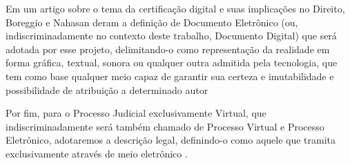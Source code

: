   Em um artigo sobre o tema da certificação digital e suas
  implicações no Direito, Boreggio e Nahasan
  \nocite{CertificadoDigital} deram a definição de Documento
  Eletrônico (ou, indiscriminadamente no contexto deste trabalho,
  Documento Digital) que será adotada por esse projeto,
  delimitando-o como representação da realidade em forma gráfica,
  textual, sonora ou qualquer outra admitida pela tecnologia, que
  tem como base qualquer meio capaz de garantir sua certeza e
  imutabilidade e possibilidade de atribuição a determinado autor
  \cite[p. 24]{CertificadoDigital}

  Por fim, para o Processo Judicial exclusivamente Virtual, que
  indiscriminadamente será também chamado de Processo Virtual e
  Processo Eletrônico, adotaremos a descrição legal, definindo-o
  como aquele que tramita exclusivamente através de meio
  eletrônico \cite{Lei11419}.
